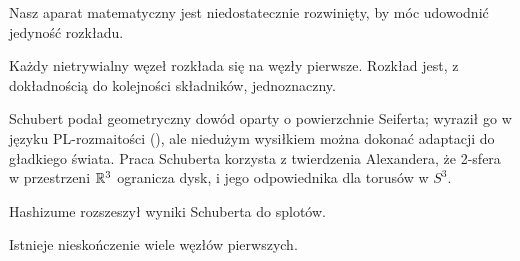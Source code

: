 Nasz aparat matematyczny jest niedostatecznie rozwinięty, by móc udowodnić jedyność rozkładu.

\begin{theorem}[Schubert, 1949]
    Każdy nietrywialny węzeł rozkłada się na węzły pierwsze.
    Rozkład jest, z dokładnością do kolejności składników, jednoznaczny.
%
\end{theorem}

Schubert podał geometryczny dowód oparty o powierzchnie Seiferta; wyraził go w języku PL-rozmaitości (\cite{schubert1949}), ale niedużym wysiłkiem można dokonać adaptacji do gładkiego świata.
%
Praca Schuberta korzysta z twierdzenia Alexandera, że 2-sfera w przestrzeni $\mathbb R^3$ ogranicza dysk, i jego odpowiednika dla torusów w $S^3$.

Hashizume \cite{hashizume1958} rozszeszył wyniki Schuberta do splotów.
%

\begin{proposition}
\label{prp:infinitely_many_prime_knots}%
    Istnieje nieskończenie wiele węzłów pierwszych.
\end{proposition}

